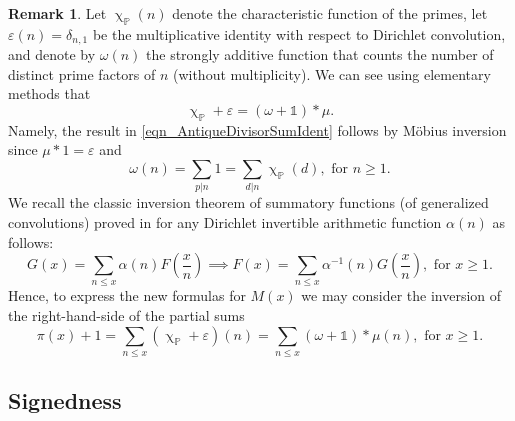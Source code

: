 \documentclass[11pt,reqno,a4letter]{article}
\numberwithin{equation}{section}
\numberwithin{figure}{section}
\numberwithin{table}{section}
\renewcommand{\chi}{\upchi}
\theoremstyle{plain}
\numberwithin{theorem}{section}
\theoremstyle{definition}
\newtheorem{remark}[theorem]{Remark}
\begin{document}
\begin{remark} 
Let $\chi_{\mathbb{P}}(n)$ denote the characteristic function of the primes, let 
$\varepsilon(n) = \delta_{n,1}$ be the multiplicative identity 
with respect to Dirichlet convolution, 
and denote by $\omega(n)$ the strongly additive function that counts the number of 
distinct prime factors of $n$ (without multiplicity). 
We can see using elementary methods that 
\begin{equation}
\label{eqn_AntiqueDivisorSumIdent} 
\chi_{\mathbb{P}} + \varepsilon = (\omega + \mathds{1}) \ast \mu. 
\end{equation} 
Namely, the result in \eqref{eqn_AntiqueDivisorSumIdent} follows by M\"obius inversion 
since $\mu \ast 1 = \varepsilon$ and 
\[
\omega(n) = \sum_{p|n} 1 = \sum_{d|n} \chi_{\mathbb{P}}(d), \text{ for } n \geq 1. 
\]
We recall the classic inversion theorem of summatory functions 
(of generalized convolutions) proved in 
\cite[\S 2.14]{APOSTOLANUMT} for any Dirichlet invertible arithmetic 
function $\alpha(n)$ as follows: 
\begin{equation}
\label{eqn_ApostolStmt_ClassicSummatoryFuncInvThm_v1} 
G(x) = \sum_{n \leq x} \alpha(n) F\left(\frac{x}{n}\right) \implies 
     F(x) = \sum_{n \leq x} \alpha^{-1}(n) G\left(\frac{x}{n}\right), 
     \text{ for } x \geq 1. 
\end{equation}
Hence, to express the new formulas for $M(x)$ 
we may consider the inversion of the right-hand-side of the partial sums 
\[
\pi(x) + 1 = \sum_{n \leq x} \left(\chi_{\mathbb{P}} + \varepsilon\right)(n) = 
	\sum_{n \leq x} (\omega + \mathds{1}) \ast \mu(n), 
	\text{ for } x \geq 1. 
\]
\end{remark}

\subsection{Signedness}
\label{Section_PrelimProofs_Config} 
\label{subSection_ProofOfSignednessOfgInvn_v1} 
\end{document}
